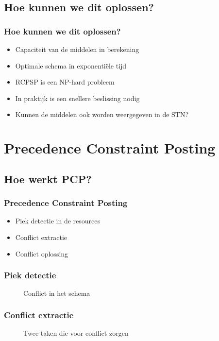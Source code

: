 \documentclass{beamer}
\theoremstyle{definition}
\newcommand{\inputtikz}[1]{}
\begin{document}
\subsection{Hoe kunnen we dit oplossen?}
\begin{frame}
	\frametitle{Hoe kunnen we dit oplossen?}
	\begin{itemize}
		\item Capaciteit van de middelen in berekening
		\item Optimale schema in exponenti\"{e}le tijd
		\item RCPSP is een NP-hard probleem
		\item In praktijk is een snellere beslissing nodig
		\item Kunnen de middelen ook worden weergegeven in de STN?
	\end{itemize}
\end{frame}

\section{Precedence Constraint Posting}


\subsection{Hoe werkt PCP?}
\begin{frame}
	\frametitle{Precedence Constraint Posting}
	\begin{itemize}
		\item Piek detectie in de resources
		\item Conflict extractie
		\item Conflict oplossing
	\end{itemize}
\end{frame}

\begin{frame}
	\frametitle{Piek detectie}
	\vspace{-1.2em}
	\begin{figure}[ht]
		\makebox[\textwidth][c]{\resizebox{.36\paperwidth}{!}{
			\inputtikz{schedule_infeasible_colored_profile}
		}}
		\vspace{-1.3em}
		\caption{Conflict in het schema}
	\end{figure}
\end{frame}

\begin{frame}
	\frametitle{Conflict extractie}
	\vspace{-1.2em}
	\begin{figure}[ht]
		\makebox[\textwidth][c]{\resizebox{.36\paperwidth}{!}{
			\inputtikz{schedule_infeasible_colored_profile_2}
		}}
		\vspace{-1.3em}
		\caption{Twee taken die voor conflict zorgen}
	\end{figure}
\end{frame}
\end{document}
